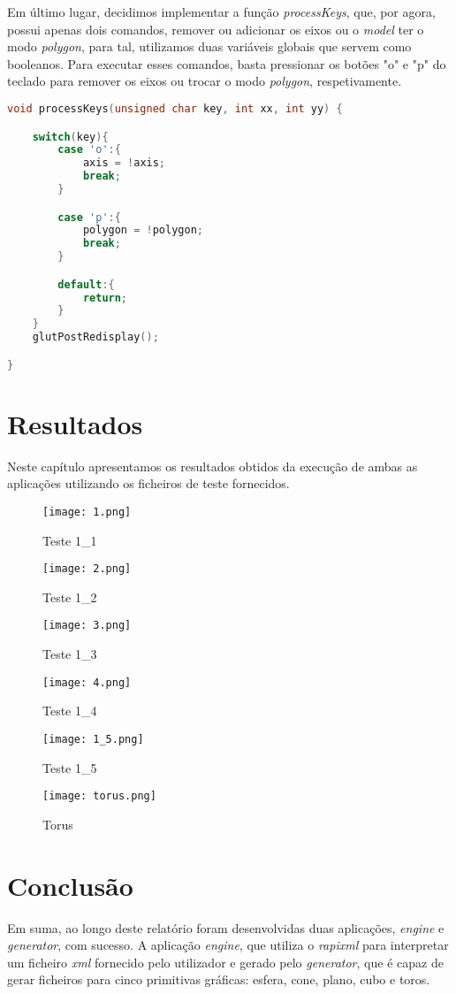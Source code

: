 \documentclass[14pt, a4 paper]{report}
\begin{document}
Em último lugar, decidimos implementar a função \textit{processKeys}, que, por agora, possui apenas dois comandos, remover ou adicionar os eixos ou o \textit{model} ter o modo \textit{polygon}, para tal, utilizamos duas variáveis globais que servem como booleanos. Para executar esses comandos, basta pressionar os botões "o" e "p" do teclado para remover os eixos ou trocar o modo \textit{polygon}, respetivamente.
\begin{lstlisting}[language = c++]
void processKeys(unsigned char key, int xx, int yy) {

	switch(key){
		case 'o':{
			axis = !axis;
			break;
		}

		case 'p':{
			polygon = !polygon;
			break;
		}

		default:{
			return;
		}
	}
	glutPostRedisplay();

}
\end{lstlisting}

\chapter{Resultados} \label{chap:resultado}

Neste capítulo apresentamos os resultados obtidos da execução de ambas as aplicações utilizando os ficheiros de teste fornecidos. 

\begin{figure}[h]
\centering
\texttt{[image: 1.png]}
\caption{Teste 1\_1}
\end{figure}

\begin{figure}[h]
\centering
\texttt{[image: 2.png]}
\caption{Teste 1\_2}
\end{figure}

\begin{figure}[h]
\centering
\texttt{[image: 3.png]}
\caption{Teste 1\_3}
\end{figure}

\begin{figure}[h]
\centering
\texttt{[image: 4.png]}
\caption{Teste 1\_4}
\end{figure}

\begin{figure}[h]
\centering
\texttt{[image: 1\_5.png]}
\caption{Teste 1\_5}
\end{figure}

\begin{figure}[h]
\centering
\texttt{[image: torus.png]}
\caption{Torus}
\end{figure}

\chapter{Conclusão} \label{chap:conclusion}

Em suma, ao longo deste relatório foram desenvolvidas duas aplicações, \textit{engine} e \textit{generator}, com sucesso.
A aplicação \textit{engine}, que utiliza o \textit{rapixml} para interpretar um ficheiro \textit{xml} fornecido pelo utilizador e gerado pelo \textit{generator}, que é capaz de gerar ficheiros para cinco primitivas gráficas: esfera, cone, plano, cubo e toros.
\end{document}
